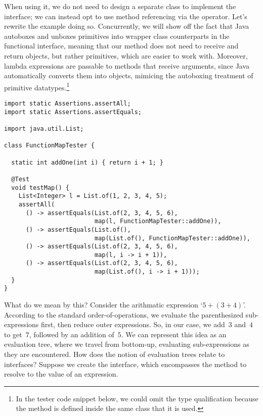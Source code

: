 When using it, we do not need to design a separate  class to implement the interface; we can instead opt to use method referencing via the \ttt{::} operator. 
Let's rewrite the  example doing so. 
Concurrently, we will show off the fact that Java autoboxes and unboxes primitives into wrapper class counterparts in the functional interface, meaning that our  method does not need to receive and return objects, but rather primitives, which are easier to work with. 
Moreover, lambda expressions are passable to methods that receive  arguments, since Java automatically converts them into  objects, mimicing the autoboxing treatment of primitive datatypes.\footnote{In the tester code snippet below, we could omit the  type qualification because the method is defined inside the same class that it is used.}

\begin{lstlisting}[language=MyJava]
import static Assertions.assertAll;
import static Assertions.assertEquals;

import java.util.List;

class FunctionMapTester {

  static int addOne(int i) { return i + 1; }

  @Test
  void testMap() {
    List<Integer> l = List.of(1, 2, 3, 4, 5);
    assertAll(
      () -> assertEquals(List.of(2, 3, 4, 5, 6), 
                         map(l, FunctionMapTester::addOne)),
      () -> assertEquals(List.of(),   
                         map(List.of(), FunctionMapTester::addOne)),
      () -> assertEquals(List.of(2, 3, 4, 5, 6), 
                         map(l, i -> i + 1)),
      () -> assertEquals(List.of(2, 3, 4, 5, 6), 
                         map(List.of(), i -> i + 1)));
  }
}
\end{lstlisting}

What do we mean by this? 
Consider the arithmatic expression `$5 + (3 + 4)$'. 
According to the standard order-of-operations, we evaluate the parenthesized sub-expressions first, then reduce outer expressions. 
So, in our case, we add~$3$ and~$4$ to get~$7$, followed by an addition of~$5$. 
We can represent this idea as an evaluation tree, where we travel from bottom-up, evaluating sub-expressions as they are encountered. 
How does the notion of evaluation trees relate to interfaces? 
Suppose we create the  interface, which encompasses the  method to resolve to the value of an expression.


